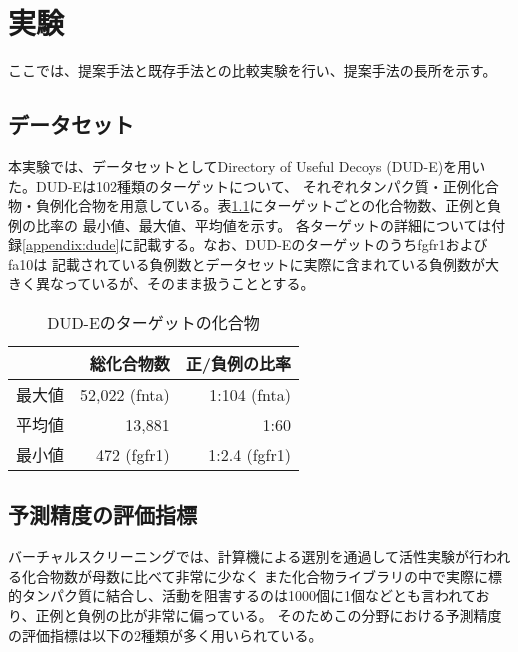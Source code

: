 \chapter{実験}
ここでは、提案手法と既存手法との比較実験を行い、提案手法の長所を示す。


\section{データセット}
本実験では、データセットとしてDirectory of Useful Decoys (DUD-E)\cite{Mysinger2012}を用いた。DUD-Eは102種類のターゲットについて、
それぞれタンパク質・正例化合物・負例化合物を用意している。表\ref{table:dude}にターゲットごとの化合物数、正例と負例の比率の
最小値、最大値、平均値を示す。
各ターゲットの詳細については付録\ref{appendix:dude}に記載する。なお、DUD-Eのターゲットのうちfgfr1およびfa10は
記載されている負例数とデータセットに実際に含まれている負例数が大きく異なっているが、そのまま扱うこととする。

\begin{table}[htb] \centering
	\caption{DUD-Eのターゲットの化合物}
	\label {table:dude}
	\begin{tabular}{c|rr}
	\hline
			&総化合物数		&正/負例の比率	\\ \hline
	最大値	&52,022 (fnta)		&1:104 (fnta)		\\
	平均値	&13,881			&1:60			\\
	最小値	&472 (fgfr1)		&1:2.4 (fgfr1)		\\ \hline
	\end{tabular}
\end{table}

	
\section{予測精度の評価指標}
バーチャルスクリーニングでは、計算機による選別を通過して活性実験が行われる化合物数が母数に比べて非常に少なく
また化合物ライブラリの中で実際に標的タンパク質に結合し、活動を阻害するのは1000個に1個などとも言われており、正例と負例の比が非常に偏っている。
そのためこの分野における予測精度の評価指標は以下の2種類が多く用いられている。


